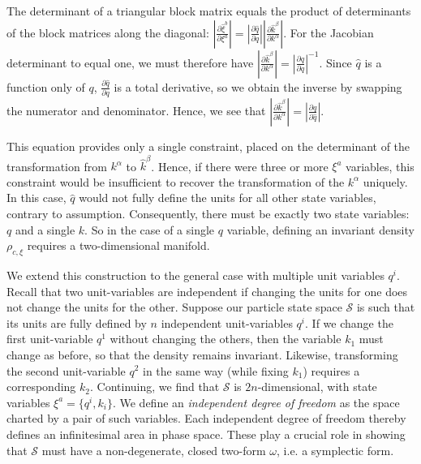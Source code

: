 \documentclass[12pt, english, twoside]{article} %
\begin{document}
\noindent
The determinant of a triangular block matrix equals the product of determinants of the block matrices along the diagonal: $ \left|\frac{\partial \hat{\xi}^b}{\partial \xi^a} \right| =  \left|\frac{\partial \hat{q}}{\partial q}\right| \left|\frac{\partial \hat{k}^\beta}{\partial k^\alpha}\right|$. For the Jacobian determinant to equal one, we must therefore have  $\left|\frac{\partial \hat{k}^\beta}{\partial k^\alpha} \right| =   \left|\frac{\partial \hat{q}}{\partial q}\right|^{-1}$. Since $\hat q$ is a function only of $q$, $\frac{\partial \hat{q}}{\partial q}$ is a total derivative, so we obtain the inverse by swapping the numerator and denominator. Hence, we see that $\left|\frac{\partial \hat{k}^\beta}{\partial k^\alpha} \right| = \left|\frac{\partial q}{\partial \hat q} \right|$. 

This equation provides only a single constraint, placed on the determinant of the transformation from $k^\alpha$ to $\hat{k}^\beta$. Hence, if there were three or more $\xi^a$ variables, this constraint would be insufficient to recover the transformation of the $k^\alpha$ uniquely. In this case, $\hat q$  would not fully define the units for all other state variables, contrary to assumption. Consequently, there must be exactly two state variables: $q$ and a single $k$. So in the case of a single $q$ variable, defining an invariant density $\rho_{c, \xi}$ requires a two-dimensional manifold.

We extend this construction to the general case with multiple unit variables $q^i$. Recall that two unit-variables are independent if changing the units for one does not change the units for the other. Suppose our particle state space $\mathcal{S}$ is such that its units are fully defined by $n$ independent unit-variables $q^i$. If we change the first unit-variable $q^1$ without changing the others, then the variable $k_1$ must change as before, so that the density remains invariant. Likewise, transforming the second unit-variable $q^2$ in the same way (while fixing $k_1$) requires a corresponding $k_2$. Continuing, we find that $\mathcal{S}$ is $2n$-dimensional, with state variables $\xi^a = \{ q^i, k_i \}$. We define an \textit{independent degree of freedom} as the space charted by a pair of such variables. Each independent degree of freedom thereby defines an infinitesimal area in phase space. These play a crucial role in showing that $\mathcal{S}$ must have a non-degenerate, closed two-form $\omega$, i.e. a symplectic form. 
\end{document}
